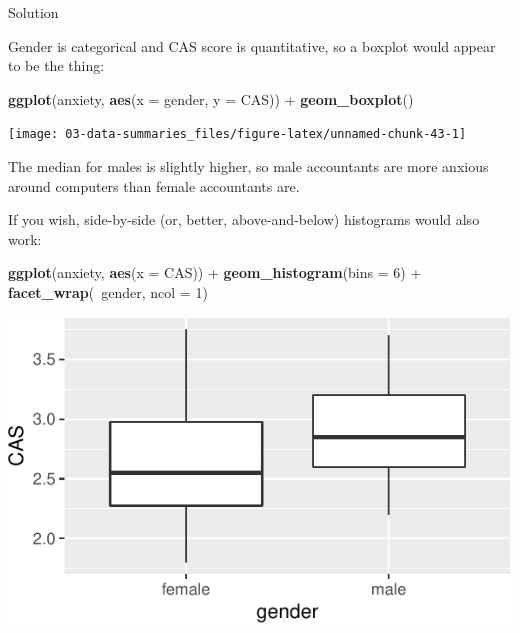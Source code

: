 \documentclass[]{tufte-book}
\newenvironment{Shaded}{}{}
\newcommand{\DataTypeTok}[1]{\textcolor[rgb]{0.56,0.13,0.00}{#1}}
\newcommand{\DecValTok}[1]{\textcolor[rgb]{0.25,0.63,0.44}{#1}}
\newcommand{\KeywordTok}[1]{\textcolor[rgb]{0.00,0.44,0.13}{\textbf{#1}}}
\newcommand{\NormalTok}[1]{#1}
\newcommand{\OperatorTok}[1]{\textcolor[rgb]{0.40,0.40,0.40}{#1}}
\newcommand{\StringTok}[1]{\textcolor[rgb]{0.25,0.44,0.63}{#1}}
\theoremstyle{definition}
\theoremstyle{definition}
\theoremstyle{definition}
\theoremstyle{remark}
\begin{document}
Solution

Gender is categorical and CAS score is quantitative, so a boxplot would
appear to be the thing:

\begin{Shaded}
\begin{Highlighting}[]
\KeywordTok{ggplot}\NormalTok{(anxiety, }\KeywordTok{aes}\NormalTok{(}\DataTypeTok{x =}\NormalTok{ gender, }\DataTypeTok{y =}\NormalTok{ CAS)) }\OperatorTok{+}\StringTok{ }\KeywordTok{geom_boxplot}\NormalTok{()}
\end{Highlighting}
\end{Shaded}

\texttt{[image: 03-data-summaries\_files/figure-latex/unnamed-chunk-43-1]}

The median for males is slightly higher, so male accountants are more
anxious around computers than female accountants are.

If you wish, side-by-side (or, better, above-and-below) histograms would
also work:

\begin{Shaded}
\begin{Highlighting}[]
\KeywordTok{ggplot}\NormalTok{(anxiety, }\KeywordTok{aes}\NormalTok{(}\DataTypeTok{x =}\NormalTok{ CAS)) }\OperatorTok{+}\StringTok{ }\KeywordTok{geom_histogram}\NormalTok{(}\DataTypeTok{bins =} \DecValTok{6}\NormalTok{) }\OperatorTok{+}\StringTok{ }
\StringTok{    }\KeywordTok{facet_wrap}\NormalTok{(}\OperatorTok{~}\NormalTok{gender, }\DataTypeTok{ncol =} \DecValTok{1}\NormalTok{)}
\end{Highlighting}
\end{Shaded}

\includegraphics{03-data-summaries_files/figure-latex/unnamed-chunk-44-1}
\end{document}
